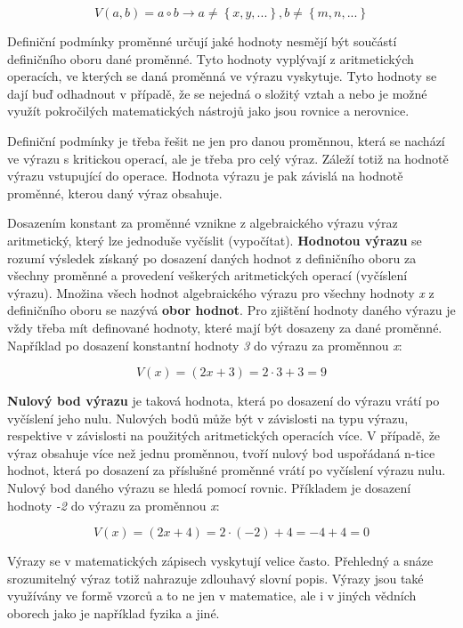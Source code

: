 $$ V(a, b) = a \circ b \rightarrow a \not = \left\{x, y, ... \right\}, b \not = \left\{ m, n, ...\right\} $$


Definiční podmínky proměnné určují jaké hodnoty nesmějí být součástí definičního oboru dané proměnné. Tyto hodnoty vyplývají z aritmetických operacích, ve kterých se daná proměnná ve výrazu vyskytuje. Tyto hodnoty se dají buď odhadnout v případě, že se nejedná o složitý vztah a nebo je možné využít pokročilých matematických nástrojů jako jsou rovnice a nerovnice. 

Definiční podmínky je třeba řešit ne jen pro danou proměnnou, která se nachází ve výrazu s kritickou operací, ale je třeba pro celý výraz. Záleží totiž na hodnotě výrazu vstupující do operace. Hodnota výrazu je pak závislá na hodnotě proměnné, kterou daný výraz obsahuje.



Dosazením konstant za proměnné vznikne z algebraického výrazu výraz aritmetický, který lze jednoduše vyčíslit (vypočítat). {\bf Hodnotou výrazu} se rozumí výsledek získaný po dosazení daných hodnot z definičního oboru za všechny proměnné a provedení veškerých aritmetických operací (vyčíslení výrazu). Množina všech hodnot algebraického výrazu pro všechny hodnoty {\it x} z definičního oboru se nazývá {\bf obor hodnot}. Pro zjištění hodnoty daného výrazu je vždy třeba mít definované hodnoty, které mají být dosazeny za dané proměnné. Například po dosazení konstantní hodnoty {\it 3} do výrazu za proměnnou {\it x}:

$$ V(x) = (2x + 3) = 2\cdot 3 + 3 = 9 $$

{\bf Nulový bod výrazu} je taková hodnota, která po dosazení do výrazu vrátí po vyčíslení jeho nulu. Nulových bodů může být v závislosti na typu výrazu, respektive v závislosti na použitých aritmetických operacích více. V případě, že výraz obsahuje více než jednu proměnnou, tvoří nulový bod uspořádaná n-tice hodnot, která po dosazení za příslušné proměnné vrátí po vyčíslení výrazu nulu. Nulový bod daného výrazu se hledá pomocí rovnic. Příkladem je dosazení hodnoty {\it -2} do výrazu za proměnnou {\it x}:

$$ V(x) = (2x + 4) = 2 \cdot (-2) +4 = -4 +4 = 0 $$

Výrazy se v matematických zápisech vyskytují velice často. Přehledný a snáze srozumitelný výraz totiž nahrazuje zdlouhavý slovní popis. Výrazy jsou také využívány ve formě vzorců a to ne jen v matematice, ale i v jiných vědních oborech jako je například fyzika a jiné.

